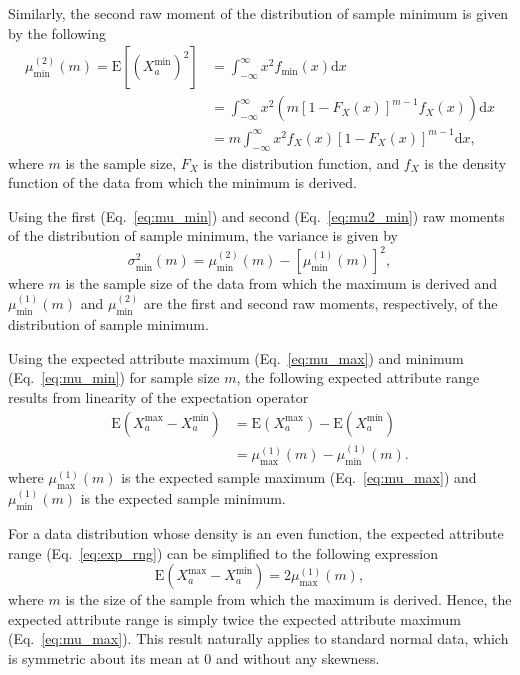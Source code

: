 \documentclass[aos]{imsart}
\begin{document}
Similarly, the second raw moment of the distribution of sample minimum is given by the following
%
\begin{equation}\label{eq:mu2_min}
\begin{aligned}
\mu^{(2)}_\text{min}(m) = \text{E}[(X^\text{min}_a)^2] &= \int_{-\infty}^{\infty}x^2 f_\text{min}(x)\text{d}x \\
&= \int_{-\infty}^{\infty}x^2 \left(m [1 - F_X(x)]^{m-1} f_X(x)\right)\text{d}x \\
&= m \int_{-\infty}^{\infty}x^2 f_X(x) [1 - F_X(x)]^{m-1}\text{d}x,
\end{aligned}
\end{equation}
%
where $m$ is the sample size, $F_X$ is the distribution function, and $f_X$ is the density function of the data from which the minimum is derived.

Using the first (Eq.~\ref{eq:mu_min}) and second (Eq.~\ref{eq:mu2_min}) raw moments of the distribution of sample minimum, the variance is given by
%
\begin{equation}\label{eq:sig_min}
\sigma^2_\text{min}(m) = \mu^{(2)}_\text{min}(m) - \left[\mu^{(1)}_\text{min}(m)\right]^2,
\end{equation}
%
where $m$ is the sample size of the data from which the maximum is derived and $\mu^{(1)}_\text{min}(m)$ and $\mu^{(2)}_\text{min}$ are the first and second raw moments, respectively, of the distribution of sample minimum.

Using the expected attribute maximum (Eq.~\ref{eq:mu_max}) and minimum (Eq.~\ref{eq:mu_min}) for sample size $m$, the following expected attribute range results from linearity of the expectation operator
%
\begin{equation}\label{eq:exp_rng}
\begin{aligned}
\text{E}(X^\text{max}_a - X^\text{min}_a) &= \text{E}(X^\text{max}_a) - \text{E}(X^\text{min}_a) \\
&= \mu^{(1)}_\text{max}(m) - \mu^{(1)}_\text{min}(m).
\end{aligned}
\end{equation}
%
where $\mu^{(1)}_\text{max}(m)$ is the expected sample maximum (Eq.~\ref{eq:mu_max}) and $\mu^{(1)}_\text{min}(m)$ is the expected sample minimum.

For a data distribution whose density is an even function, the expected attribute range (Eq.~\ref{eq:exp_rng}) can be simplified to the following expression
%
\begin{equation}\label{eq:exp_rng_symm}
\text{E}(X^\text{max}_a - X^\text{min}_a) = 2 \mu^{(1)}_\text{max}(m),
\end{equation}
%
where $m$ is the size of the sample from which the maximum is derived. Hence, the expected attribute range is simply twice the expected attribute maximum (Eq.~\ref{eq:mu_max}). This result naturally applies to standard normal data, which is symmetric about its mean at 0 and without any skewness.  
\end{document}
